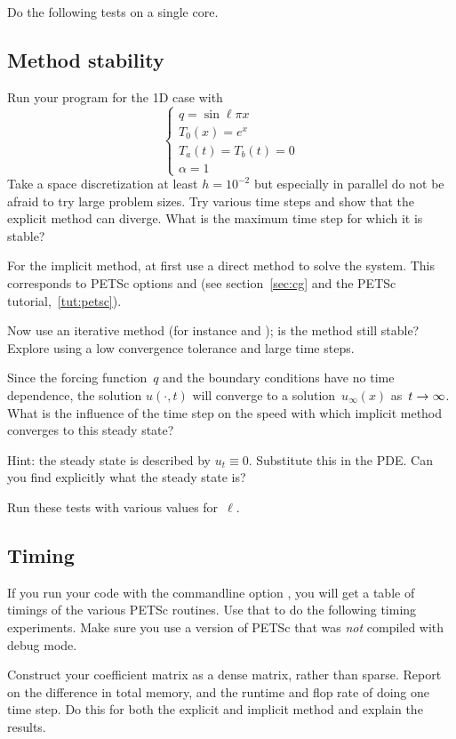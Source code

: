 Do the following tests on a single core.

\subsection*{Method stability}

Run your program for the 1D case with 
\[
\begin{cases}
  q=\sin\ell\pi x\\ T_0(x)=e^x\\ T_a(t)=T_b(t)=0\\ \alpha=1
\end{cases}
\]
Take a space discretization at least $h=10^{-2}$ but especially in
parallel do not be afraid to try large problem sizes. Try various 
time steps
and show that
the explicit method can diverge. What is the maximum time step for
which it is stable? 

For the implicit method, at first use a direct method to solve the
system.
This corresponds to PETSc options  and  (see
section~\ref{sec:cg} and the PETSc tutorial,~\ref{tut:petsc}).

Now use an iterative method (for instance  and );
is the method still stable? Explore using a low convergence tolerance
and large time steps. 

Since the forcing function~$q$ and the boundary conditions have no
time dependence, the solution $u(\cdot,t)$ will converge to a
 solution~$u_\infty(x)$
as~$t\rightarrow\nobreak\infty$. What is the influence of the time step on the
speed with which implicit method converges to this steady state?

Hint: the steady state is described by $u_t\equiv0$. Substitute this
in the \ac{PDE}. Can you find explicitly what the steady state is?

Run these tests with various values for~$\ell$.

\subsection*{Timing}

If you run your code with the commandline option , you
will get a table of timings of the various PETSc routines. Use that to do
the following timing experiments. Make sure you use a version of PETSc
that was \emph{not} compiled with debug mode.

Construct your coefficient matrix as a dense matrix, rather than
sparse. Report on the difference in total memory, and the runtime and
flop rate of doing one time step. Do this for both the explicit and
implicit method and explain the results.

